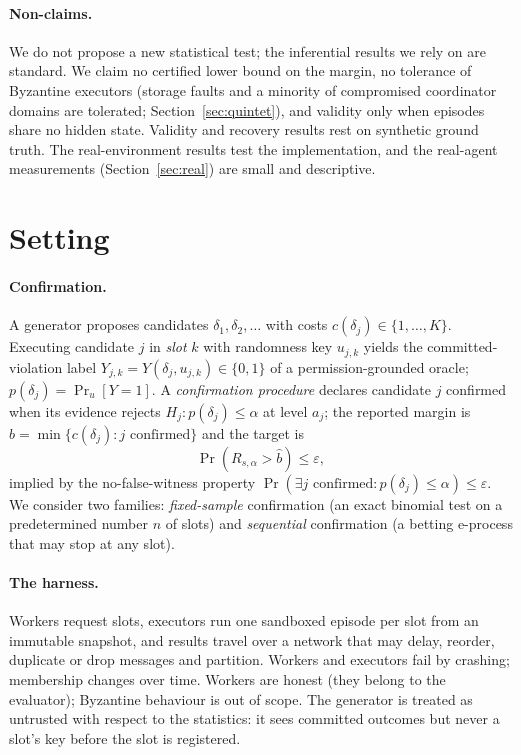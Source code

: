 \documentclass[pdflatex,sn-mathphys-num]{sn-jnl}
\theoremstyle{thmstyleone}
\theoremstyle{thmstyletwo}
\theoremstyle{thmstylethree}
\newcommand{\bhat}{\hat b}
\begin{document}
\paragraph{Non-claims.} We do not propose a new statistical test; the inferential results we rely on are standard. We claim no certified lower bound on the margin, no tolerance of Byzantine executors (storage faults and a minority of compromised coordinator domains are tolerated; Section~\ref{sec:quintet}), and validity only when episodes share no hidden state. Validity and recovery results rest on synthetic ground truth. The real-environment results test the implementation, and the real-agent measurements (Section~\ref{sec:real}) are small and descriptive.

\section{Setting}\label{sec:setting}

\paragraph{Confirmation.} A generator proposes candidates $\delta_1,\delta_2,\dots$ with costs $c(\delta_j)\in\{1,\dots,K\}$. Executing candidate $j$ in \emph{slot} $k$ with randomness key $u_{j,k}$ yields the committed-violation label $Y_{j,k}=Y(\delta_j,u_{j,k})\in\{0,1\}$ of a permission-grounded oracle; $p(\delta_j)=\Pr_u[Y=1]$. A \emph{confirmation procedure} declares candidate $j$ confirmed when its evidence rejects $H_j:p(\delta_j)\le\alpha$ at level $a_j$; the reported margin is $\bhat=\min\{c(\delta_j):j\text{ confirmed}\}$ and the target is
\begin{equation}
\Pr(R_{s,\alpha}>\bhat)\le\varepsilon,\label{eq:G1}
\end{equation}
implied by the no-false-witness property $\Pr(\exists j\text{ confirmed}:p(\delta_j)\le\alpha)\le\varepsilon$. We consider two families: \emph{fixed-sample} confirmation (an exact binomial test on a predetermined number $n$ of slots) and \emph{sequential} confirmation (a betting e-process that may stop at any slot).

\paragraph{The harness.} Workers request slots, executors run one sandboxed episode per slot from an immutable snapshot, and results travel over a network that may delay, reorder, duplicate or drop messages and partition. Workers and executors fail by crashing; membership changes over time. Workers are honest (they belong to the evaluator); Byzantine behaviour is out of scope. The generator is treated as untrusted with respect to the statistics: it sees committed outcomes but never a slot's key before the slot is registered.
\end{document}
